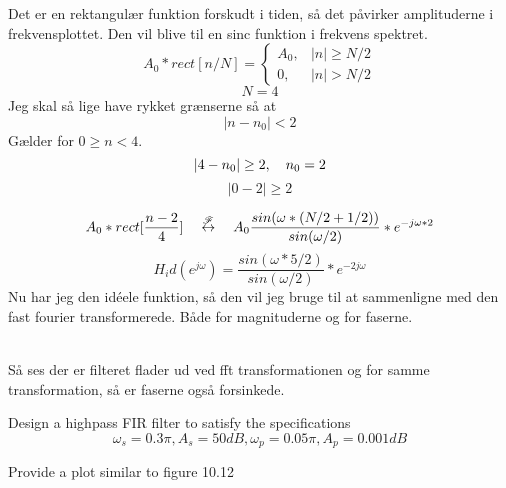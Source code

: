 \begin{Opgaver}
\begin{kapitel}
\begin{Opgave}
            \begin{UnderOpgave}
                Det er en rektangulær funktion forskudt i tiden, så det påvirker amplituderne i frekvensplottet.
                Den vil blive til en sinc funktion i frekvens spektret.
                \[A_0*rect[n/N] = \left\{ \begin{array}{ll} A_0, & |n|\geq N/2 \\ 0, & |n|>N/2\end{array}\right.\]
                \[N = 4\]
                Jeg skal så lige have rykket grænserne så at
                \[|n - n_0|<2\] 
                Gælder for $0\geq n < 4$. 
                \[|4 - n_0|\geq 2, \tab{0} n_0 = 2\]
                \[|0 - 2| \geq 2\]
                
                \[A_0*rect[\frac{n - 2}{4}] \transformation{F} A_0 \frac{sin(\omega * (N/2 + 1/2))}{sin(\omega/2)} * e^{-j\omega * 2}\] 
                \[H_id(e^{j\omega}) = \frac{sin(\omega * 5/2)}{sin(\omega/2)} * e^{-2j\omega}\]
                Nu har jeg den idéele funktion, så den vil jeg bruge til at sammenligne med den fast fourier transformerede. Både for magnituderne og for faserne.
            \end{UnderOpgave}
            \\
            Så ses der er filteret flader ud ved fft transformationen og for samme transformation, så er faserne også forsinkede.

        \end{Opgave}       
        \begin{Opgave}[Opgave 10.10]     
            Design a highpass FIR filter to satisfy the specifications 
            \[\omega_s = 0.3\pi, A_s = 50dB, \omega_p = 0.05\pi, A_p = 0.001dB\]
            \begin{UnderOpgave}
                Provide a plot similar to figure 10.12\\


\end{UnderOpgave}
\end{Opgave}
\end{kapitel}
\end{Opgaver}
